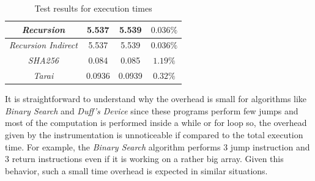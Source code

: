 \begin{table}
\begin{tabular}{|c|c|c|c|}
    \hline
    \textit{Recursion}                   & 5.537                        & 5.539                        & $0.036\%$              \\
    \hline
    \textit{Recursion Indirect}          & 5.537                        & 5.539                        & $0.036\%$              \\
    \hline
    \textit{SHA256}                      & 0.084                        & 0.085                        & $1.19\%$               \\
    \hline
    \textit{Tarai}                       & 0.0936                       & 0.0939                       & $0.32\%$               \\
    \hline
  \end{tabular}
  \caption{Test results for execution times}
  \label{tab:times}
\end{table}

It is straightforward to understand why the overhead is small for algorithms
like \textit{Binary Search} and \textit{Duff's Device} since these programs
perform few jumps and most of the computation is performed inside a while or for
loop so, the overhead given by the instrumentation is unnoticeable if compared to
the total execution time. For example, the \textit{Binary Search} algorithm
performs $3$ jump instruction and $3$ return instructions even if it is working
on a rather big array. Given this behavior, such a small time overhead is
expected in similar situations.

